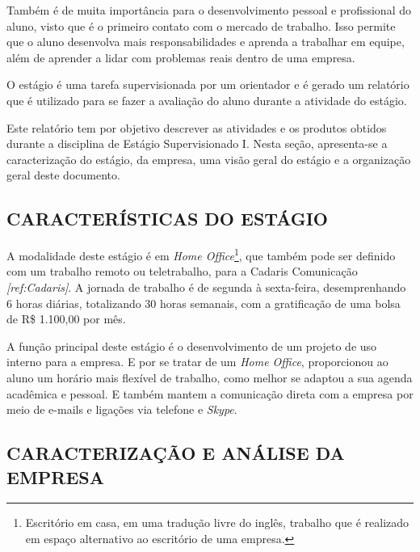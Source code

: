 \documentclass[
  12pt,				%
  openany,
  oneside,
  a4paper,			%
  english,			%
  brazil
]{article}
\numberwithin{figure}{section}
\numberwithin{table}{section}
\begin{document}
Também é de muita importância para o desenvolvimento pessoal e profissional do aluno, visto que é o primeiro contato com o mercado de trabalho. Isso permite que o aluno desenvolva mais responsabilidades e aprenda a trabalhar em equipe, além de aprender a lidar com problemas reais dentro de uma empresa.

O estágio é uma tarefa supervisionada por um orientador e é gerado um relatório que é utilizado para se fazer a avaliação do aluno durante a atividade do estágio.

Este relatório tem por objetivo descrever as atividades e os produtos obtidos durante a disciplina de Estágio Supervisionado I. Nesta seção, apresenta-se a caracterização do estágio, da empresa, uma visão geral do estágio e a organização geral deste documento.


\subsection{CARACTERÍSTICAS DO ESTÁGIO}

A modalidade deste estágio é em \textit{Home Office}\footnote{Escritório em casa, em uma tradução livre do inglês, trabalho que é realizado em espaço alternativo ao escritório de uma empresa.}, que também pode ser definido com um trabalho remoto ou teletrabalho, para a Cadaris Comunicação \textit{[ref:Cadaris]}. A jornada de trabalho é de segunda à sexta-feira, desemprenhando 6 horas diárias, totalizando 30 horas semanais, com a gratificação de uma bolsa de R\$ 1.100,00 por mês.

A função principal deste estágio é o desenvolvimento de um projeto de uso interno para a empresa. E por se tratar de um \textit{Home Office}, proporcionou ao aluno um horário mais flexível de trabalho, como melhor se adaptou a sua agenda acadêmica e pessoal. E também mantem a comunicação direta com a empresa por meio de e-mails e ligações via telefone e \textit{Skype}.



\subsection{CARACTERIZAÇÃO E ANÁLISE DA EMPRESA}

\end{document}
